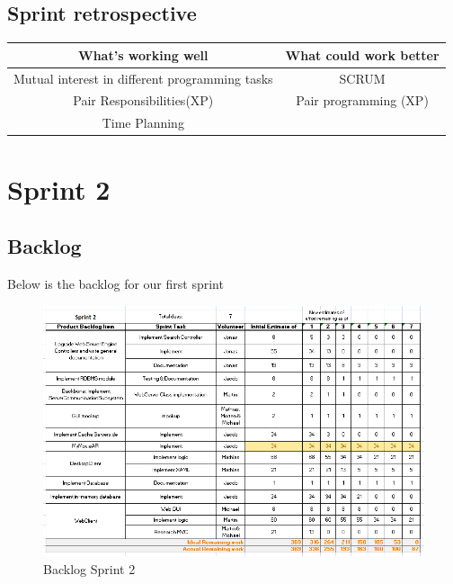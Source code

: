 \documentclass[]{report}
\begin{document}
\section{Sprint retrospective}

\begin{center}
\begin{tabular}{|c|c|}
\hline \textbf{What's working well} & \textbf{What could work better} \\ 
\hline Mutual interest in different programming tasks & SCRUM \\ 
Pair Responsibilities(XP) & Pair programming (XP) \\ 
 Time Planning &  \\ 
\hline 
\end{tabular} 
\end{center}



\newpage
\chapter{Sprint 2}
\label{chap:Spring 2}

\section{Backlog}
Below is the backlog for our first sprint
\begin{figure}[h]
\includegraphics[scale=0.6]{img/backlogSprint2.png}
\caption{Backlog Sprint 2}
\label{fig:Backlog Sprint 2}
\end{figure}

\newpage
\end{document}
